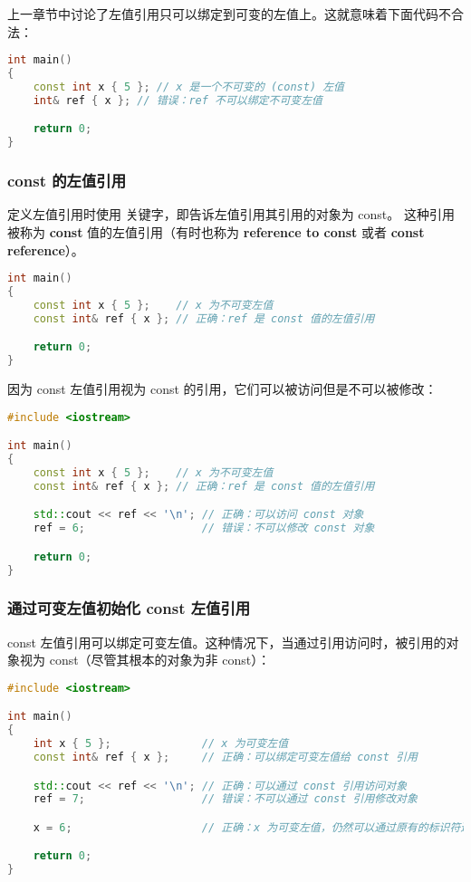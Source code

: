 \documentclass[../../LearnCpp.tex]{subfiles}
\begin{document}

上一章节中讨论了左值引用只可以绑定到可变的左值上。这就意味着下面代码不合法：

\begin{lstlisting}[language=C++]
int main()
{
    const int x { 5 }; // x 是一个不可变的 (const) 左值
    int& ref { x }; // 错误：ref 不可以绑定不可变左值

    return 0;
}
\end{lstlisting}

\subsubsection*{const 的左值引用}

定义左值引用时使用  关键字，即告诉左值引用其引用的对象为 const。
这种引用被称为 \textbf{const} 值的左值引用（有时也称为 \textbf{reference to const} 或者 \textbf{const reference}）。

\begin{lstlisting}[language=C++]
int main()
{
    const int x { 5 };    // x 为不可变左值
    const int& ref { x }; // 正确：ref 是 const 值的左值引用

    return 0;
}
\end{lstlisting}

因为 const 左值引用视为 const 的引用，它们可以被访问但是不可以被修改：

\begin{lstlisting}[language=C++]
#include <iostream>

int main()
{
    const int x { 5 };    // x 为不可变左值
    const int& ref { x }; // 正确：ref 是 const 值的左值引用

    std::cout << ref << '\n'; // 正确：可以访问 const 对象
    ref = 6;                  // 错误：不可以修改 const 对象

    return 0;
}
\end{lstlisting}

\subsubsection*{通过可变左值初始化 const 左值引用}

const 左值引用可以绑定可变左值。这种情况下，当通过引用访问时，被引用的对象视为 const（尽管其根本的对象为非 const）：

\begin{lstlisting}[language=C++]
#include <iostream>

int main()
{
    int x { 5 };              // x 为可变左值
    const int& ref { x };     // 正确：可以绑定可变左值给 const 引用

    std::cout << ref << '\n'; // 正确：可以通过 const 引用访问对象
    ref = 7;                  // 错误：不可以通过 const 引用修改对象

    x = 6;                    // 正确：x 为可变左值，仍然可以通过原有的标识符进行修改

    return 0;
}
\end{lstlisting}
\end{document}
